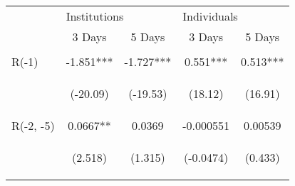 \documentclass[border=0.2cm]{standalone}
\begin{document}
\begin{tabular}{lcccc}
                           & \multicolumn{2}{l}{Institutions}               & \multicolumn{2}{l}{Individuals}                                                                                                                   \\
    \cmidrule(l){2-3} \cmidrule(l){4-5}
                           & 3 Days                                         & 5 Days                                         & 3 Days                                          & 5 Days                                         \\
    \toprule
    \vspace{2pt}           & \begin{footnotesize}\end{footnotesize}         & \begin{footnotesize}\end{footnotesize}         & \begin{footnotesize}\end{footnotesize}          & \begin{footnotesize}\end{footnotesize}         \\
    R(-1)                  & -1.851***                                      & -1.727***                                      & 0.551***                                        & 0.513***                                       \\
    \vspace{4pt}           & \begin{footnotesize}(-20.09)\end{footnotesize} & \begin{footnotesize}(-19.53)\end{footnotesize} & \begin{footnotesize}(18.12)\end{footnotesize}   & \begin{footnotesize}(16.91)\end{footnotesize}  \\
    R(-2, -5)              & 0.0667**                                       & 0.0369                                         & -0.000551                                       & 0.00539                                        \\
    \vspace{4pt}           & \begin{footnotesize}(2.518)\end{footnotesize}  & \begin{footnotesize}(1.315)\end{footnotesize}  & \begin{footnotesize}(-0.0474)\end{footnotesize} & \begin{footnotesize}(0.433)\end{footnotesize}  \\

\end{tabular}
\end{document}
